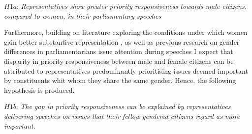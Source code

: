 \vspace{5pt}
$H1{a}$: \textit{Representatives show greater priority responsiveness towards male citizens, compared to women, in their parliamentary speeches}
\vspace{5pt}

Furthermore, building on literature exploring the conditions under which women gain better substantive representation \parencite[e.g.,][]{bratton_descriptive_2002, lovenduski_feminizing_2002, clayton_quota_2018}, as well as previous research on gender differences in parliamentarians issue attention during speeches \parencite[e.g.,][]{back_when_2019, unal_role_2021, catalano_women_2009,hargrave_earning_nodate} I expect that disparity in priority responsiveness between male and female citizens can be attributed to representatives predominantly prioritising issues deemed important by constituents whit whom they share the same gender. Hence, the following hypothesis is produced.  

\vspace{5pt}
$H1{b}$: \textit{The gap in priority responsiveness can be explained by representatives delivering speeches on issues that their fellow gendered citizens regard as more important.}
\vspace{5pt}






 